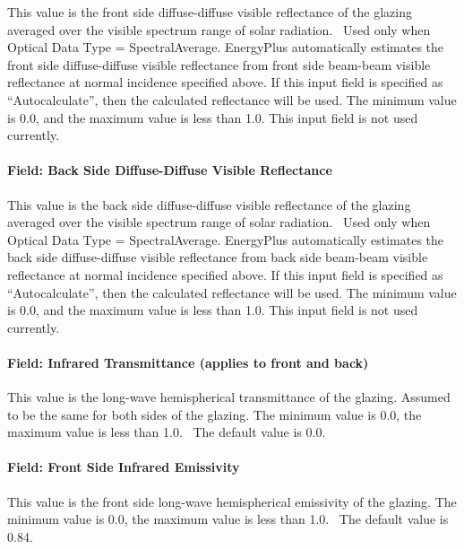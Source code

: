 This value is the front side diffuse-diffuse visible reflectance of the glazing averaged over the visible spectrum range of solar radiation.~ Used only when Optical Data Type = SpectralAverage. EnergyPlus automatically estimates the front side diffuse-diffuse visible reflectance from front side beam-beam visible reflectance at normal incidence specified above. If this input field is specified as ``Autocalculate'', then the calculated reflectance will be used. The minimum value is 0.0, and the maximum value is less than 1.0. This input field is not used currently.

\paragraph{Field: Back Side Diffuse-Diffuse Visible Reflectance}\label{field-back-side-diffuse-diffuse-visible-reflectance}

This value is the back side diffuse-diffuse visible reflectance of the glazing averaged over the visible spectrum range of solar radiation.~ Used only when Optical Data Type = SpectralAverage. EnergyPlus automatically estimates the back side diffuse-diffuse visible reflectance from back side beam-beam visible reflectance at normal incidence specified above. If this input field is specified as ``Autocalculate'', then the calculated reflectance will be used. The minimum value is 0.0, and the maximum value is less than 1.0. This input field is not used currently.

\paragraph{Field: Infrared Transmittance (applies to front and back)}\label{field-infrared-transmittance-applies-to-front-and-back}

This value is the long-wave hemispherical transmittance of the glazing. Assumed to be the same for both sides of the glazing. The minimum value is 0.0, the maximum value is less than 1.0.~ The default value is 0.0.

\paragraph{Field: Front Side Infrared Emissivity}\label{field-front-side-infrared-emissivity}

This value is the front side long-wave hemispherical emissivity of the glazing. The minimum value is 0.0, the maximum value is less than 1.0.~ The default value is 0.84.

